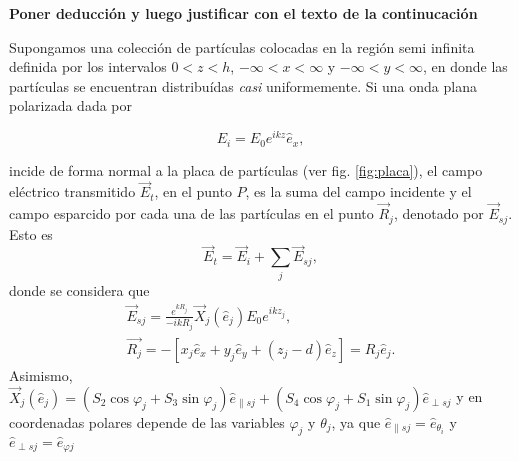 
\label{app:RefIndSlabScatterers}
{
\color{red}\textbf{Poner deducción y luego justificar con el texto de la continucación}}




Supongamos una colección de partículas colocadas en la región semi infinita definida por los intervalos $0<z<h$, $-\infty<x<\infty$ y $-\infty<y<\infty$, en donde las partículas se encuentran distribuídas \emph{casi} uniformemente. Si una onda plana  polarizada dada por

\begin{equation}
{E}_i  = E_0 e^{ikz}\hat{e}_x, \label{eq:E_i}
\end{equation}


incide de forma normal a la placa de partículas (ver fig. \ref{fig:placa}), el campo eléctrico transmitido $\vec{E}_t$, en el punto $P$, es la suma del campo incidente y el campo esparcido por cada una de las partículas en el punto $\vec{R}_j$, denotado por $\vec{E}_{sj}$. Esto es
\begin{equation}
\vec{E}_t = \vec{E}_i + \sum_j \vec{E}_{sj}, \label{eq:E_t}
\end{equation}
donde se considera que
\begin{align}
\vec{E}_{sj} = \frac{e^{k R_j}}{-ikR_j}\vec{X}_j (\hat{e}_j)E_0 e^{ikz_j}, \\
\vec{R_j} = - [x_j \hat{e}_x + y_j \hat{e}_y + (z_j-d)\hat{e}_z ] = R_j \hat{e}_j.\label{eq:RenP}
\end{align}
Asimismo,  $\vec{X}_j(\hat{e}_j) = (S_2 \cos\varphi_j + S_3\sin\varphi_j) \hat{e}_{\parallel s j} + (S_4 \cos\varphi_j + S_1 \sin\varphi_j) \hat{e}_{\perp s j }$ y en coordenadas polares depende de las variables $\varphi_j$ y $\theta_j$, ya que $\hat{e}_{\parallel s j} = \hat{e}_{\theta_i}$ y $\hat{e}_{\perp s j } = \hat{e}_{\varphi j}$

